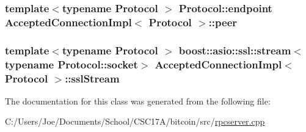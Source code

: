 \subsubsection[{peer}]{\setlength{\rightskip}{0pt plus 5cm}template$<$typename Protocol $>$ Protocol\+::endpoint {\bf Accepted\+Connection\+Impl}$<$ Protocol $>$\+::peer}\label{class_accepted_connection_impl_ade939b7d2778690cf78a9f6719f47c76}
\hypertarget{class_accepted_connection_impl_add3b600f08eabed89746393e5c319527}{}
\subsubsection[{ssl\+Stream}]{\setlength{\rightskip}{0pt plus 5cm}template$<$typename Protocol $>$ boost\+::asio\+::ssl\+::stream$<$typename Protocol\+::socket$>$ {\bf Accepted\+Connection\+Impl}$<$ Protocol $>$\+::ssl\+Stream}\label{class_accepted_connection_impl_add3b600f08eabed89746393e5c319527}


The documentation for this class was generated from the following file\+:\begin{DoxyCompactItemize}
\item 
C\+:/\+Users/\+Joe/\+Documents/\+School/\+C\+S\+C17\+A/bitcoin/src/\hyperlink{rpcserver_8cpp}{rpcserver.\+cpp}\end{DoxyCompactItemize}
